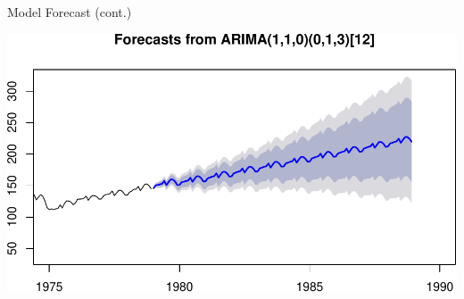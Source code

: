 \documentclass[11pt,ignorenonframetext,]{beamer}
\newenvironment{Shaded}{}{}
\newcommand{\DataTypeTok}[1]{\textcolor[rgb]{0.56,0.13,0.00}{#1}}
\newcommand{\DecValTok}[1]{\textcolor[rgb]{0.25,0.63,0.44}{#1}}
\newcommand{\FloatTok}[1]{\textcolor[rgb]{0.25,0.63,0.44}{#1}}
\newcommand{\KeywordTok}[1]{\textcolor[rgb]{0.00,0.44,0.13}{\textbf{#1}}}
\newcommand{\NormalTok}[1]{#1}
\newcommand{\OperatorTok}[1]{\textcolor[rgb]{0.40,0.40,0.40}{#1}}
\newcommand{\StringTok}[1]{\textcolor[rgb]{0.25,0.44,0.63}{#1}}
\let\oldShaded\Shaded
\let\endoldShaded\endShaded
\renewenvironment{Shaded}{\footnotesize\begin{spacing}{0.9}\oldShaded}{\endoldShaded\end{spacing}}
\begin{document}
\begin{frame}[fragile]{%
\protect\hypertarget{model-forecast-cont.-2}{%
Model Forecast (cont.)}}

\begin{Shaded}
\end{Shaded}

\begin{center}\includegraphics[width=\textwidth]{Lec11_files/figure-beamer/unnamed-chunk-32-1} \end{center}

\end{frame}
\end{document}
